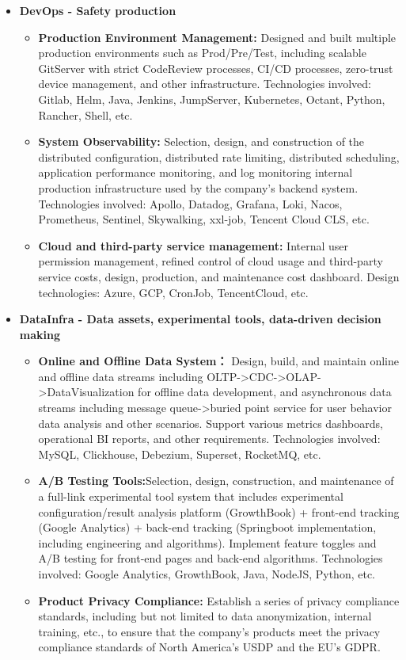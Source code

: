 \documentclass[letterpaper,11pt]{article}
\begin{document}
\begin{spacing}{0.9}
\begin{itemize}
\begin{itemize}
			\item \textbf{DevOps - Safety production}
			\begin{itemize}
				\item \textbf{Production Environment Management: }Designed and built multiple production environments such as Prod/Pre/Test, including scalable GitServer with strict CodeReview processes, CI/CD processes, zero-trust device management, and other infrastructure. Technologies involved: Gitlab, Helm, Java, Jenkins, JumpServer, Kubernetes, Octant, Python, Rancher, Shell, etc.
				\item \textbf{System Observability: }Selection, design, and construction of the distributed configuration, distributed rate limiting, distributed scheduling, application performance monitoring, and log monitoring internal production infrastructure used by the company's backend system. Technologies involved: Apollo, Datadog, Grafana, Loki, Nacos, Prometheus, Sentinel, Skywalking, xxl-job, Tencent Cloud CLS, etc.
				\item \textbf{Cloud and third-party service management: }Internal user permission management, refined control of cloud usage and third-party service costs, design, production, and maintenance cost dashboard. Design technologies: Azure, GCP, CronJob, TencentCloud, etc.
			\end{itemize}
			
			\item \textbf{DataInfra - Data assets, experimental tools, data-driven decision making}
			\begin{itemize}
				\item
				\textbf{Online and Offline Data System： }Design, build, and maintain online and offline data streams including OLTP->CDC->OLAP->DataVisualization for offline data development, and asynchronous data streams including message queue->buried point service for user behavior data analysis and other scenarios. Support various metrics dashboards, operational BI reports, and other requirements. Technologies involved: MySQL, Clickhouse, Debezium, Superset, RocketMQ, etc.
				\item
				\textbf{A/B Testing Tools:}Selection, design, construction, and maintenance of a full-link experimental tool system that includes experimental configuration/result analysis platform (GrowthBook) + front-end tracking (Google Analytics) + back-end tracking (Springboot implementation, including engineering and algorithms). Implement feature toggles and A/B testing for front-end pages and back-end algorithms. Technologies involved: Google Analytics, GrowthBook, Java, NodeJS, Python, etc.
				\item
				\textbf{Product Privacy Compliance: }Establish a series of privacy compliance standards, including but not limited to data anonymization, internal training, etc., to ensure that the company's products meet the privacy compliance standards of North America's USDP and the EU's GDPR.
			\end{itemize}
			

\end{itemize}
\end{itemize}
\end{spacing}
\end{document}
